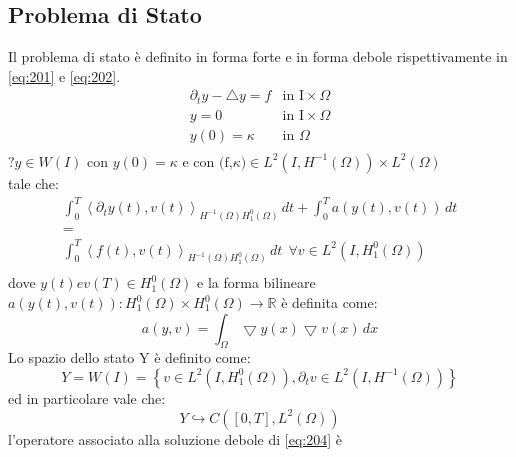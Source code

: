 \subsection{Problema di Stato}
Il problema di stato è definito in forma forte e in forma debole rispettivamente in \ref{eq:201} e \ref{eq:202}.
\begin{equation}
\begin{array}{cc}
 	{\partial_{t}}y - {\bigtriangleup}y = f & \text{in I}\times\Omega \\
	y=0 & \text{in I}\times\Omega \\
	y(0) = \kappa & \text{in }\Omega \\
\end{array}
\label{eq:201}
\end{equation}
$\text{?} y \in W(I) \text{ con } y(0)=\kappa \text{ e } \text{con (f,}\kappa) \in L^2(I,{H^{-1}(\Omega)})\times {L^{2}(\Omega)}$ \\
tale che:
\begin{equation}
\begin{array}{c}
	\int_{0}^{T} \left \langle {\partial_{t}}y(t),v(t) \right \rangle_{{H^{-1}(\Omega)}{H^{0}_{1}(\Omega)}} \, dt +  	\int_{0}^{T} a(y(t),v(t)) \, dt  \\
	 = \\
	\int_{0}^{T} \left \langle f(t),v(t) \right \rangle_{{H^{-1}(\Omega)}{H^{0}_{1}(\Omega)}} \, dt \ \ \forall v \in L^2(I,{H^{0}_{1}(\Omega)}) \\
\end{array}
\label{eq:202}
\end{equation}
dove $y(t) e v(T) \in {H^{0}_{1}(\Omega)}$ e la forma bilineare $a(y(t),v(t)): {H^{0}_{1}(\Omega)}{\times}{H^{0}_{1}(\Omega)}\rightarrow\mathbb{R}$ è definita come:
\begin{equation}
 a(y,v) = \int_{\Omega} {\bigtriangledown}y(x){\bigtriangledown}v(x) \, dx
\label{eq:203}
\end{equation}
Lo spazio dello stato Y è definito come:
\begin{equation}
Y = W(I) =  \left\{ v \in L^2(I, {H^{0}_{1}(\Omega)}), {{\partial}_{t}}v \in L^2(I, {H^{-1}(\Omega)}) \right\}
\label{eq:204}
\end{equation}
ed in particolare vale che:
\begin{equation}
Y \hookrightarrow C(\left[0,T\right], {L^{2}(\Omega)})
\label{eq:205}
\end{equation}
l'operatore associato alla soluzione debole di \ref{eq:204} è  
